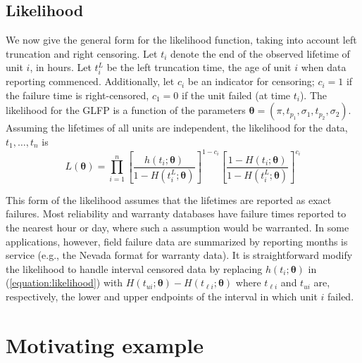 \documentclass[11pt]{article}
\begin{document}
\subsection{Likelihood}
\label{subsec:likehood}
We now give the general form for the likelihood function, taking into account left truncation and right censoring.  Let $t_{i}$ denote the end of the observed lifetime of unit $i$, in hours.  Let $t_i^L$ be the left truncation time, the age of unit $i$ when data reporting commenced. Additionally, let $c_i$ be an indicator for censoring; $c_i=1$ if the failure time is right-censored, $c_1=0$ if the unit failed (at time $t_i$). The likelihood for the GLFP is a function of the parameters $\bm{\theta} = (\pi,t_{p_1}, \sigma_1, t_{p_2}, \sigma_2)$.  Assuming the lifetimes of all units are independent, the likelihood for the data, $t_1,\ldots,t_n$ is
\begin{equation}
\label{equation:likelihood}
L(\bm{\theta})= \prod_{i=1}^{n} \left[\frac{h(t_i;\bm{\theta})}{1-H(t_i^L;\bm{\theta})}\right]^{1-c_i} \left[ \frac{1-H(t_i;\bm{\theta})}{1-H(t_i^L;\bm{\theta})} \right]^{c_i}
\end{equation}

\noindent This form of the likelihood assumes that the lifetimes are reported as exact
failures. Most reliability and warranty databases have failure times
reported to the nearest hour or day, where such a assumption would
be warranted. In some applications, however, field failure data are
summarized by reporting months is service (e.g., the Nevada format
for warranty data). It is straightforward modify the likelihood to
handle interval censored data by replacing $h(t_i;\bm{\theta})$ in
(\ref{equation:likelihood}) with $H(t_{u i};\bm{\theta})-H(t_{\ell i};\bm{\theta})$
where $t_{\ell i}$ and $t_{u i}$ are, respectively, the lower and
upper endpoints of the interval in which unit $i$
failed.

\section{Motivating example}
\label{sec:Data}
\end{document}
